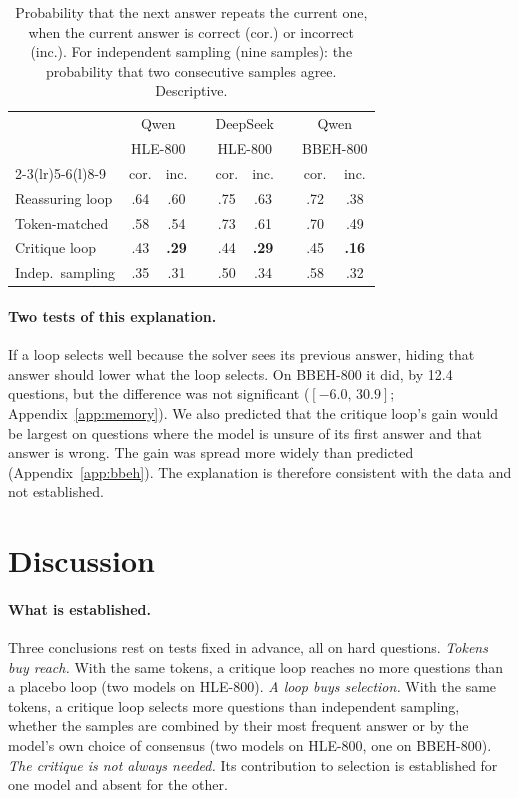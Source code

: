 \documentclass[11pt]{article}
\newcommand{\ds}{DeepSeek}
\newcommand{\qw}{Qwen}
\newcommand{\ci}[2]{$[#1,\,#2]$}
\begin{document}
\begin{table}[t]
\centering
\small
\setlength{\tabcolsep}{2.1pt}
\begin{tabular}{@{}l cc c cc c cc@{}}
\toprule
 & \multicolumn{2}{c}{\qw} & & \multicolumn{2}{c}{\ds} & & \multicolumn{2}{c}{\qw} \\
 & \multicolumn{2}{c}{HLE-800} & & \multicolumn{2}{c}{HLE-800} & & \multicolumn{2}{c}{BBEH-800} \\
\cmidrule(lr){2-3}\cmidrule(lr){5-6}\cmidrule(l){8-9}
 & cor. & inc. & & cor. & inc. & & cor. & inc. \\
\midrule
Reassuring loop & .64 & .60 & & .75 & .63 & & .72 & .38 \\
Token-matched & .58 & .54 & & .73 & .61 & & .70 & .49 \\
Critique loop & .43 & \textbf{.29} & & .44 & \textbf{.29} & & .45 & \textbf{.16} \\
Indep.\ sampling & .35 & .31 & & .50 & .34 & & .58 & .32 \\
\bottomrule
\end{tabular}
\caption{Probability that the next answer repeats the current one, when the current answer is correct (cor.) or incorrect (inc.). For independent sampling (nine samples): the probability that two consecutive samples agree. Descriptive.}
\label{tab:keep}
\end{table}

\paragraph{Two tests of this explanation.}
If a loop selects well because the solver sees its previous answer, hiding that answer should lower what the loop selects.
On BBEH-800 it did, by 12.4 questions, but the difference was not significant (\ci{-6.0}{30.9}; Appendix~\ref{app:memory}).
We also predicted that the critique loop's gain would be largest on questions where the model is unsure of its first answer and that answer is wrong. The gain was spread more widely than predicted (Appendix~\ref{app:bbeh}).
The explanation is therefore consistent with the data and not established.

\section{Discussion}

\paragraph{What is established.}
Three conclusions rest on tests fixed in advance, all on hard questions.
\emph{Tokens buy reach.} With the same tokens, a critique loop reaches no more questions than a placebo loop (two models on HLE-800).
\emph{A loop buys selection.} With the same tokens, a critique loop selects more questions than independent sampling, whether the samples are combined by their most frequent answer or by the model's own choice of consensus (two models on HLE-800, one on BBEH-800).
\emph{The critique is not always needed.} Its contribution to selection is established for one model and absent for the other.
\end{document}
